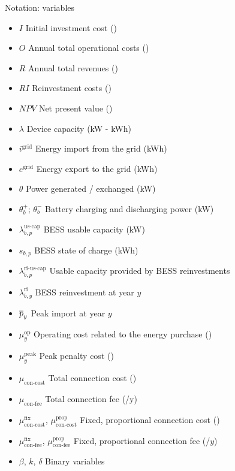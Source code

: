 \begin{frame}[allowframebreaks]{Notation: variables}
\begin{itemize}
    \item $I$ Initial investment cost (\texteuro) 
    \item $O$ Annual total operational costs (\texteuro) 
    \item $R$ Annual total revenues (\texteuro)
    \item $RI$ Reinvestment costs (\texteuro)
    \item $NPV$ Net present value (\texteuro)
    \item $\lambda$ Device capacity (kW - kWh)
    \item $\ensuremath{i}^\text{grid}$ Energy import from the grid (kWh)
    \item $\ensuremath{e}^\text{grid}$ Energy export to the grid (kWh)
    \item $\theta$ Power generated / exchanged (kW)
    \item $\theta_b^+$; $\theta_b^-$ Battery charging and discharging power (kW)
    \item $\lambda^\text{us-cap}_{b,p}$ BESS usable capacity (kW)
    \item $s_{b,p}$ BESS state of charge (kWh)
    \item $\lambda^\text{ri-us-cap}_{b,p}$ Usable capacity provided by BESS reinvestments
    \item $\lambda_{b,y}^{\text{ri}}$ BESS reinvestment at year $y$
    \item $\overline{p}_{y}$ Peak import at year $y$
    \item $\mu^{\text{op}}_y$ Operating cost related to the energy purchase (\texteuro)
    \item $\mu^{\text{peak}}_y$ Peak penalty cost (\texteuro)
    \item $\mu_{\text{con-cost}}$ Total connection cost (\texteuro)
    \item $\mu_{\text{con-fee}}$ Total connection fee (\texteuro/y) 
    \item $\mu_{\text{con-cost}}^{\text{fix}}$, $\mu_{\text{con-cost}}^{\text{prop}}$ Fixed,  proportional connection cost (\texteuro)
    \item $\mu_{\text{con-fee}}^{\text{fix}}$, $\mu_{\text{con-fee}}^{\text{prop}}$ Fixed, proportional connection fee (\texteuro/$y$)
    \item $\beta$, $k$, $\delta$  Binary variables
\end{itemize}
\end{frame}
